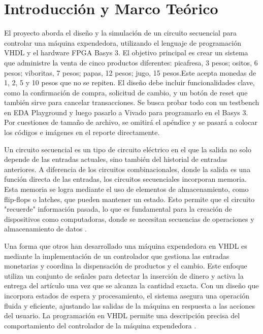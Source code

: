 \documentclass[12pt]{article}  %
\begin{document}
\section{Introducción y Marco Teórico}
El proyecto aborda el diseño y la simulación de un circuito secuencial para controlar una máquina expendedora, utilizando el lenguaje de programación VHDL y el hardware FPGA Basys 3. El objetivo principal es crear un sistema que administre la venta de cinco productos diferentes: picafresa, 3 pesos; ositos, 6 pesos; viboritas, 7 pesos; papas, 12 pesos; jugo, 15 pesos.Este acepta monedas de 1, 2, 5 y 10 pesos que no se repiten. El diseño debe incluir funcionalidades clave, como la confirmación de compra, solicitud de cambio, y un botón de reset que también sirve para cancelar transacciones. Se busca probar todo con un testbench en EDA Playground y luego pasarlo a Vivado para programarlo en el Basys 3. Por cuestiones de tamaño de archivo, se omitirá el apéndice y se pasará a colocar los códigos e imágenes en el reporte directamente.

Un circuito secuencial es un tipo de circuito eléctrico en el que la salida no solo depende de las entradas actuales, sino también del historial de entradas anteriores. A diferencia de los circuitos combinacionales, donde la salida es una función directa de las entradas, los circuitos secuenciales incorporan memoria. Esta memoria se logra mediante el uso de elementos de almacenamiento, como flip-flops o latches, que pueden mantener un estado. Esto permite que el circuito "recuerde" información pasada, lo que es fundamental para la creación de dispositivos como computadoras, donde se necesitan secuencias de operaciones y almacenamiento de datos \cite{7169287}.

Una forma que otros han desarrollado una máquina expendedora en VHDL es mediante la implementación de un controlador que gestiona las entradas monetarias y coordina la dispensación de productos y el cambio. Este enfoque utiliza un conjunto de señales para detectar la inserción de dinero y activa la entrega del artículo una vez que se alcanza la cantidad exacta. Con un diseño que incorpora estados de espera y procesamiento, el sistema asegura una operación fluida y eficiente, ajustando las salidas de la máquina en respuesta a las acciones del usuario. La programación en VHDL permite una descripción precisa del comportamiento del controlador de la máquina expendedora \cite{lameres2019quick}.
\end{document}
